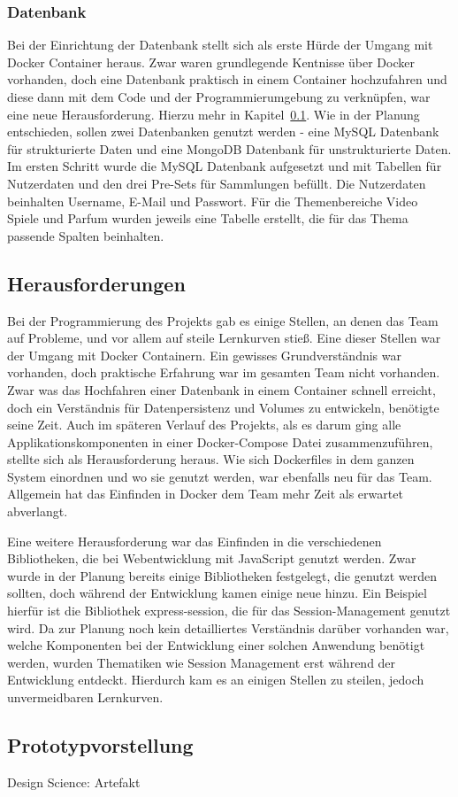 \subsubsection{Datenbank}

Bei der Einrichtung der Datenbank stellt sich als erste Hürde der Umgang mit Docker Container heraus.
Zwar waren grundlegende Kentnisse über Docker vorhanden, doch eine Datenbank praktisch in einem Container hochzufahren und diese dann mit dem Code und der Programmierumgebung zu verknüpfen, war eine neue Herausforderung.
Hierzu mehr in Kapitel~\ref{subsec:Herausforderungen}.
Wie in der Planung entschieden, sollen zwei Datenbanken genutzt werden - eine MySQL Datenbank für strukturierte Daten und eine MongoDB Datenbank für unstrukturierte Daten.
Im ersten Schritt wurde die MySQL Datenbank aufgesetzt und mit Tabellen für Nutzerdaten und den drei Pre-Sets für Sammlungen befüllt.
Die Nutzerdaten beinhalten Username, E-Mail und Passwort.
Für die Themenbereiche Video Spiele und Parfum wurden jeweils eine Tabelle erstellt, die für das Thema passende Spalten beinhalten.

\subsection{Herausforderungen}\label{subsec:Herausforderungen}

Bei der Programmierung des Projekts gab es einige Stellen, an denen das Team auf Probleme, und vor allem auf steile Lernkurven stieß.
Eine dieser Stellen war der Umgang mit Docker Containern.
Ein gewisses Grundverständnis war vorhanden, doch praktische Erfahrung war im gesamten Team nicht vorhanden.
Zwar was das Hochfahren einer Datenbank in einem Container schnell erreicht, doch ein Verständnis für Datenpersistenz und Volumes zu entwickeln, benötigte seine Zeit.
Auch im späteren Verlauf des Projekts, als es darum ging alle Applikationskomponenten in einer Docker-Compose Datei zusammenzuführen, stellte sich als Herausforderung heraus.
Wie sich Dockerfiles in dem ganzen System einordnen und wo sie genutzt werden, war ebenfalls neu für das Team.
Allgemein hat das Einfinden in Docker dem Team mehr Zeit als erwartet abverlangt.

Eine weitere Herausforderung war das Einfinden in die verschiedenen Bibliotheken, die bei Webentwicklung mit JavaScript genutzt werden.
Zwar wurde in der Planung bereits einige Bibliotheken festgelegt, die genutzt werden sollten, doch während der Entwicklung kamen einige neue hinzu.
Ein Beispiel hierfür ist die Bibliothek express-session, die für das Session-Management genutzt wird.
Da zur Planung noch kein detailliertes Verständnis darüber vorhanden war, welche Komponenten bei der Entwicklung einer solchen Anwendung benötigt werden, wurden Thematiken wie Session Management erst während der Entwicklung entdeckt.
Hierdurch kam es an einigen Stellen zu steilen, jedoch unvermeidbaren Lernkurven.

\subsection{Prototypvorstellung}\label{subsec:Prototyp}
Design Science: Artefakt